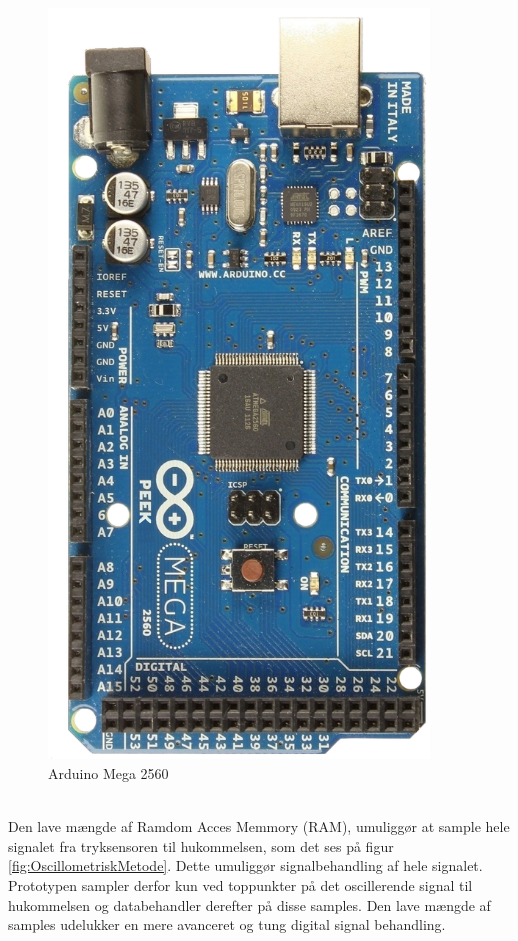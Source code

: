 \begin{minipage}[t]{0.4\textwidth}
	\begin{figure}[H]
		\centering
		\includegraphics[width = 0.9\textwidth]{billeder/arduinoMega2560.png}
		\caption{Arduino Mega 2560}\label{fig:arduinoMega2560}
	\end{figure}
\end{minipage}\\

Den lave mængde af Ramdom Acces Memmory (RAM), umuliggør at sample hele signalet fra tryksensoren til hukommelsen, som det ses på figur \ref{fig:OscillometriskMetode}. Dette umuliggør signalbehandling af hele signalet. Prototypen sampler derfor kun ved toppunkter på det oscillerende signal til hukommelsen og databehandler derefter på disse samples. Den lave mængde af samples udelukker en mere avanceret og tung digital signal behandling.

